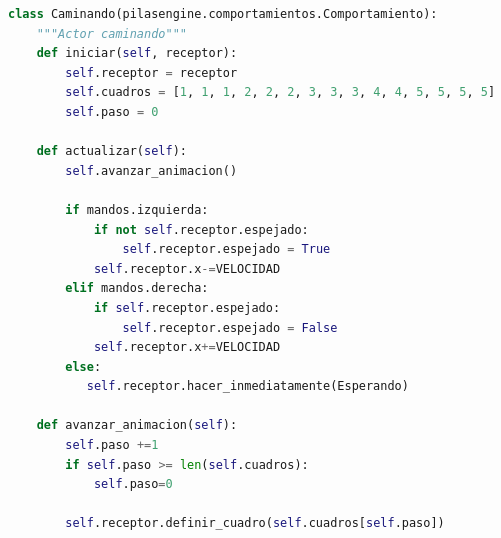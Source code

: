 \documentclass{article}
\begin{document}
\begin{lstlisting}[language=Python]
class Caminando(pilasengine.comportamientos.Comportamiento):
    """Actor caminando"""
    def iniciar(self, receptor):
        self.receptor = receptor
        self.cuadros = [1, 1, 1, 2, 2, 2, 3, 3, 3, 4, 4, 5, 5, 5, 5]
        self.paso = 0

    def actualizar(self):
        self.avanzar_animacion()
        
        if mandos.izquierda:
            if not self.receptor.espejado:
                self.receptor.espejado = True
            self.receptor.x-=VELOCIDAD
        elif mandos.derecha:
            if self.receptor.espejado:
                self.receptor.espejado = False
            self.receptor.x+=VELOCIDAD
        else:
           self.receptor.hacer_inmediatamente(Esperando)
    
    def avanzar_animacion(self):
        self.paso +=1
        if self.paso >= len(self.cuadros):
            self.paso=0
        
        self.receptor.definir_cuadro(self.cuadros[self.paso])
\end{lstlisting}
\vspace{\baselineskip}
\end{document}
